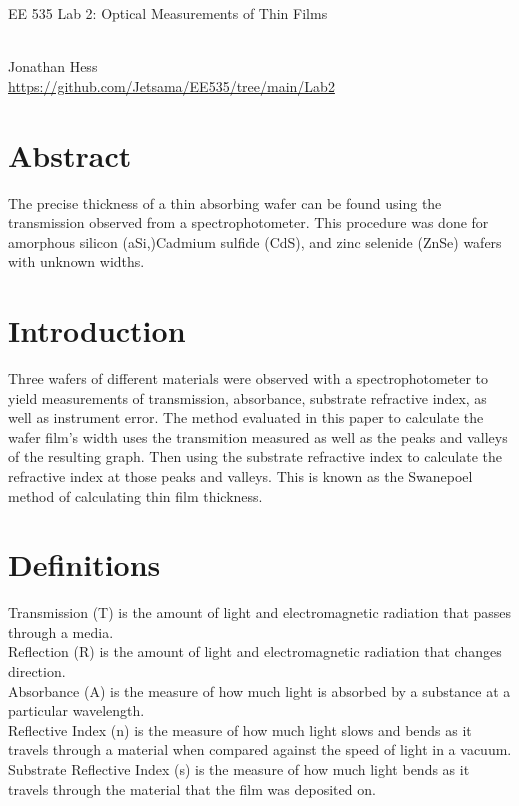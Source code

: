 \documentclass[10pt,a4paper]{article}
\begin{document}
\begin{multicols}{2}
\newenvironment{indentPar}[1]%
 {\begin{list}{}%
         {\setlength{\leftmargin}{#1}}%
         \item[]%
 }
 {\end{list}}

\begin{flushleft}
\begin{LARGE}EE 535 Lab 2: Optical Measurements of Thin Films
\end{LARGE}
\\Jonathan Hess
\\\href{https://github.com/Jetsama/EE535/tree/main/Lab2}{https://github.com/Jetsama/EE535/tree/main/Lab2}
\end{flushleft}


\section*{Abstract}

The precise thickness of a thin absorbing wafer can be found using the transmission observed from a spectrophotometer. This procedure was done for amorphous silicon (aSi,)Cadmium sulfide (CdS), and zinc selenide (ZnSe) wafers with unknown widths.





\section*{Introduction}

Three wafers of different materials were observed with a spectrophotometer to yield measurements of transmission, absorbance, substrate refractive index, as well as instrument error. The method evaluated in this paper to calculate the wafer film's width uses the transmition measured as well as the peaks and valleys of the resulting graph. Then using the substrate refractive index to calculate the  refractive index at those peaks and valleys. This is known as the Swanepoel method of calculating thin film thickness.



\section*{Definitions}
Transmission (T) is the amount of light and electromagnetic radiation that passes through a media.\\
Reflection (R) is the amount of light and electromagnetic radiation that changes direction. \\
Absorbance (A) is the measure of how much light is absorbed by a substance at a particular wavelength.\\
Reflective Index (n) is the measure of how much light slows and bends as it travels through a material when compared against the speed of light in a vacuum.
Substrate Reflective Index (s) is the measure of how much light bends as it travels through the material that the film was deposited on.
	

\end{multicols}
\end{document}
